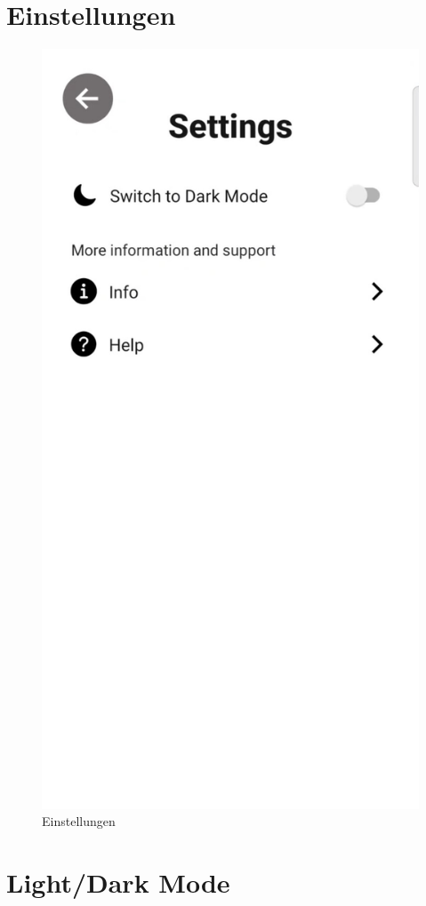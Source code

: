 \section{Einstellungen}

\begin{figure}[H]
    \centering
    \includegraphics[height=\textwidth]{./pics/Settings.jpg}
    \caption{Einstellungen}
\end{figure}

\section{Light/Dark Mode}

